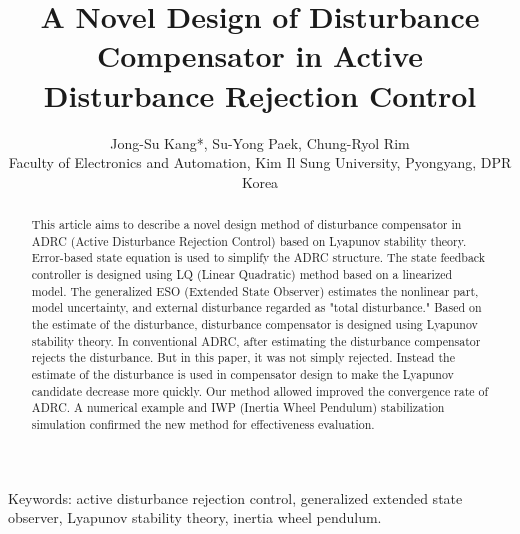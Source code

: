 \documentclass[10pt]{article}
\title{A Novel Design of Disturbance Compensator in Active Disturbance Rejection Control }
\author{Jong-Su Kang*, Su-Yong Paek, Chung-Ryol Rim\\
Faculty of Electronics and Automation, Kim Il Sung University, Pyongyang, DPR Korea}
\date{}
\begin{document}
\maketitle


\begin{abstract}
This article aims to describe a novel design method of disturbance compensator in ADRC (Active Disturbance Rejection Control) based on Lyapunov stability theory. Error-based state equation is used to simplify the ADRC structure. The state feedback controller is designed using LQ (Linear Quadratic) method based on a linearized model. The generalized ESO (Extended State Observer) estimates the nonlinear part, model uncertainty, and external disturbance regarded as "total disturbance." Based on the estimate of the disturbance, disturbance compensator is designed using Lyapunov stability theory. In conventional ADRC, after estimating the disturbance compensator rejects the disturbance. But in this paper, it was not simply rejected. Instead the estimate of the disturbance is used in compensator design to make the Lyapunov candidate decrease more quickly. Our method allowed improved the convergence rate of ADRC. A numerical example and IWP (Inertia Wheel Pendulum) stabilization simulation confirmed the new method for effectiveness evaluation.
\end{abstract}

Keywords: active disturbance rejection control, generalized extended state observer, Lyapunov stability theory, inertia wheel pendulum.
\end{document}
